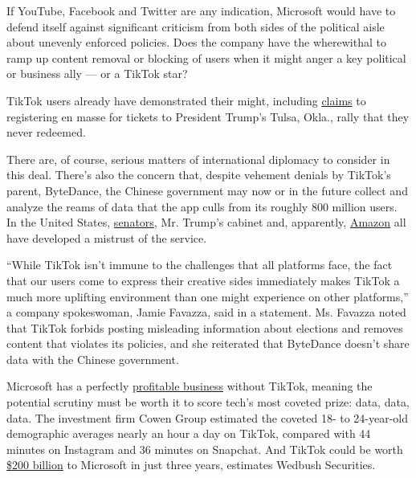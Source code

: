 If YouTube, Facebook and Twitter are any indication, Microsoft would
have to defend itself against significant criticism from both sides of
the political aisle about unevenly enforced policies. Does the company
have the wherewithal to ramp up content removal or blocking of users
when it might anger a key political or business ally --- or a TikTok
star?

TikTok users already have demonstrated their might, including
\href{https://www.nytimes3xbfgragh.onion/2020/06/21/style/tiktok-trump-rally-tulsa.html}{claims}
to registering en masse for tickets to President Trump's Tulsa, Okla.,
rally that they never redeemed.

There are, of course, serious matters of international diplomacy to
consider in this deal. There's also the concern that, despite vehement
denials by TikTok's parent, ByteDance, the Chinese government may now or
in the future collect and analyze the reams of data that the app culls
from its roughly 800 million users. In the United States,
\href{https://www.nytimes3xbfgragh.onion/reuters/2020/07/22/technology/22reuters-usa-tiktok-vote.html}{senators},
Mr. Trump's cabinet and, apparently,
\href{https://www.nytimes3xbfgragh.onion/2020/07/10/technology/tiktok-amazon-security-risk.html}{Amazon}
all have developed a mistrust of the service.

``While TikTok isn't immune to the challenges that all platforms face,
the fact that our users come to express their creative sides immediately
makes TikTok a much more uplifting environment than one might experience
on other platforms,'' a company spokeswoman, Jamie Favazza, said in a
statement. Ms. Favazza noted that TikTok forbids posting misleading
information about elections and removes content that violates its
policies, and she reiterated that ByteDance doesn't share data with the
Chinese government.

Microsoft has a perfectly
\href{https://www.wsj.com/articles/microsoft-revenue-surges-thoughazure-cloud-growth-slows-11595449687}{profitable
business} without TikTok, meaning the potential scrutiny must be worth
it to score tech's most coveted prize: data, data, data. The investment
firm Cowen Group estimated the coveted 18- to 24-year-old demographic
averages nearly an hour a day on TikTok, compared with 44 minutes on
Instagram and 36 minutes on Snapchat. And TikTok could be worth
\href{https://markets.businessinsider.com/news/stocks/microsoft-tiktok-stock-add-value-billion-deal-wall-street-analyst-2020-8-1029463140\#}{\$200
billion} to Microsoft in just three years, estimates Wedbush Securities.

